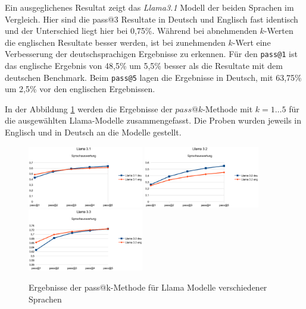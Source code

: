 Ein ausgeglichenes Resultat zeigt das \textit{Llama3.1} Modell der beiden Sprachen im Vergleich. Hier sind die pass@3 Resultate in Deutsch und Englisch fast identisch und der Unterschied liegt hier bei 0,75\%. Während bei abnehmenden $k$-Werten die englischen Resultate besser werden, ist bei zunehmenden $k$-Wert eine Verbesserung der deutschsprachigen Ergebnisse zu erkennen. Für den \texttt{pass@1} ist das englische Ergebnis von 48,5\% um 5,5\% besser als die Resultate mit dem deutschen Benchmark. Beim \texttt{pass@5} lagen die Ergebnisse in Deutsch, mit 63,75\% um 2,5\% vor den englischen Ergebnissen.\vspace{0.2cm}

In der Abbildung \ref{img:pass_at_k_results_by_llama_lang} werden die Ergebnisse der $pass@k$-Methode mit $k=1 … 5$ für die ausgewählten Llama-Modelle zusammengefasst. Die Proben wurden jeweils in Englisch und in Deutsch an die Modelle gestellt.\vspace{0.2cm}

\begin{figure}[!ht]
	\includegraphics[width=0.45\textwidth]{content/chapter_evaluation/images/llama31_evaluation_lang.eps}
	\includegraphics[width=0.45\textwidth]{content/chapter_evaluation/images/llama32_evaluation_lang.eps}
	\includegraphics[width=0.45\textwidth]{content/chapter_evaluation/images/llama33_evaluation_lang.eps}
	\caption{Ergebnisse der pass@k-Methode für Llama Modelle verschiedener Sprachen}
	\label{img:pass_at_k_results_by_llama_lang}
\end{figure}

